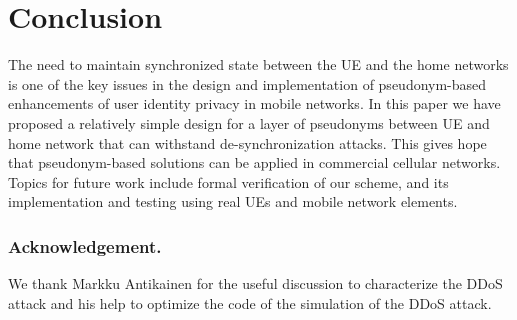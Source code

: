 \documentclass{llncs} %
\begin{document}
\section{Conclusion} \label{sec:conclusion}
The need to maintain synchronized state between the UE and the home networks is one of the key issues in the design and implementation of pseudonym-based enhancements of user identity privacy in mobile networks. In this paper we have proposed  a relatively simple design for a layer of pseudonyms between UE and home network that can withstand de-synchronization attacks. This gives hope that pseudonym-based solutions can be applied in commercial cellular networks. Topics for future work include formal verification of our scheme, and its implementation and testing using real UEs and mobile network elements.


\subsubsection{Acknowledgement.}
\label{sec:acknowledgement}
We thank Markku Antikainen for the useful discussion to characterize the DDoS attack and his help to optimize the code of the simulation of the DDoS attack.



{}




\end{document}
